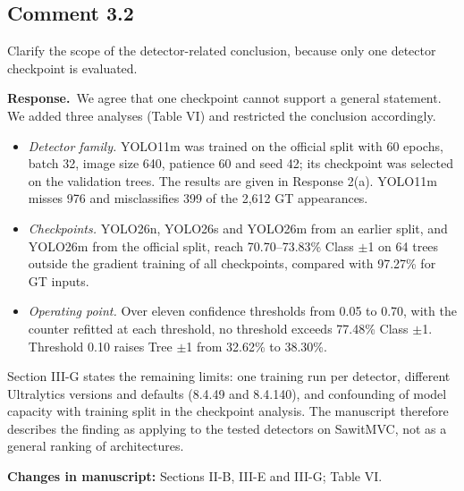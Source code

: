 \documentclass[10pt,a4paper]{article}
\newcommand{\resp}{\textbf{Response.}\ }
\newcommand{\changes}[1]{\par\textbf{Changes in manuscript:} #1}
\begin{document}
\subsection{Comment 3.2}
\begin{cmt}
Clarify the scope of the detector-related conclusion, because only one detector
checkpoint is evaluated.
\end{cmt}
\resp We agree that one checkpoint cannot support a general statement. We added three
analyses (Table VI) and restricted the conclusion accordingly.
\begin{itemize}
\item \emph{Detector family.} YOLO11m was trained on the official split with 60 epochs,
  batch 32, image size 640, patience 60 and seed 42; its checkpoint was selected on the
  validation trees. The results are given in Response 2(a). YOLO11m misses 976 and
  misclassifies 399 of the 2,612 GT appearances.
\item \emph{Checkpoints.} YOLO26n, YOLO26s and YOLO26m from an earlier split, and YOLO26m
  from the official split, reach 70.70--73.83\% Class $\pm$1 on 64 trees outside the
  gradient training of all checkpoints, compared with 97.27\% for GT inputs.
\item \emph{Operating point.} Over eleven confidence thresholds from 0.05 to 0.70, with
  the counter refitted at each threshold, no threshold exceeds 77.48\% Class $\pm$1.
  Threshold 0.10 raises Tree $\pm$1 from 32.62\% to 38.30\%.
\end{itemize}
Section III-G states the remaining limits: one training run per detector, different
Ultralytics versions and defaults (8.4.49 and 8.4.140), and confounding of model
capacity with training split in the checkpoint analysis. The manuscript therefore
describes the finding as applying to the tested detectors on SawitMVC, not as a general
ranking of architectures.
\changes{Sections II-B, III-E and III-G; Table VI.}
\end{document}
